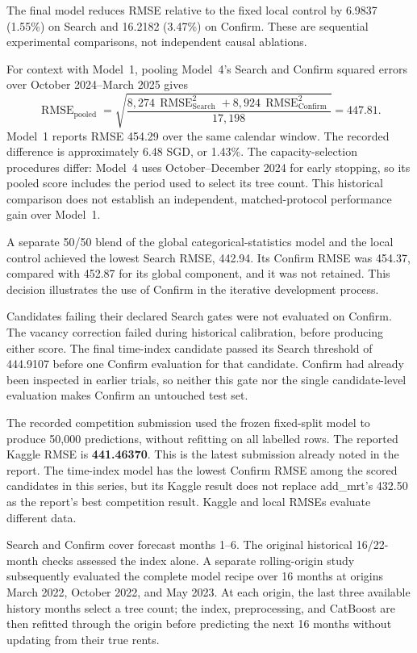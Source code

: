 \documentclass[10pt,a4paper]{article}
\begin{document}
The final model reduces RMSE relative to the fixed local
control by 6.9837 (1.55\%) on Search and 16.2182 (3.47\%)
on Confirm.
These are sequential experimental comparisons, not independent
causal ablations.

For context with Model~1, pooling Model~4's Search and Confirm
squared errors over October 2024--March 2025 gives
\[
\operatorname{RMSE}_{\mathrm{pooled}}
=
\sqrt{
\frac{
8{,}274\,\operatorname{RMSE}_{\mathrm{Search}}^2
+
8{,}924\,\operatorname{RMSE}_{\mathrm{Confirm}}^2
}{
17{,}198
}}
=
447.81.
\]
Model~1 reports RMSE 454.29 over the same calendar window.
The recorded difference is approximately 6.48 SGD, or 1.43\%.
The capacity-selection procedures differ: Model~4 uses
October--December 2024 for early stopping, so its pooled
score includes the period used to select its tree count.
This historical comparison does not establish an independent,
matched-protocol performance gain over Model~1.

A separate 50/50 blend of the global categorical-statistics
model and the local control achieved the lowest Search RMSE,
442.94.
Its Confirm RMSE was 454.37, compared with 452.87 for its
global component, and it was not retained.
This decision illustrates the use of Confirm in the iterative
development process.

Candidates failing their declared Search gates were not
evaluated on Confirm.
The vacancy correction failed during historical calibration,
before producing either score.
The final time-index candidate passed its Search threshold
of 444.9107 before one Confirm evaluation for that candidate.
Confirm had already been inspected in earlier trials, so
neither this gate nor the single candidate-level evaluation
makes Confirm an untouched test set.

The recorded competition submission used the frozen
fixed-split model to produce 50{,}000 predictions, without
refitting on all labelled rows.
The reported Kaggle RMSE is \textbf{441.46370}.
This is the latest submission already noted in the report.
The time-index model has the lowest Confirm RMSE among the
scored candidates in this series, but its Kaggle result does
not replace add\_mrt's 432.50 as the report's best competition
result.
Kaggle and local RMSEs evaluate different data.

Search and Confirm cover forecast months 1--6.
The original historical 16/22-month checks assessed the index
alone.
A separate rolling-origin study subsequently evaluated the
complete model recipe over 16 months at origins March 2022,
October 2022, and May 2023.
At each origin, the last three available history months select
a tree count; the index, preprocessing, and CatBoost are then
refitted through the origin before predicting the next
16 months without updating from their true rents.
\end{document}
